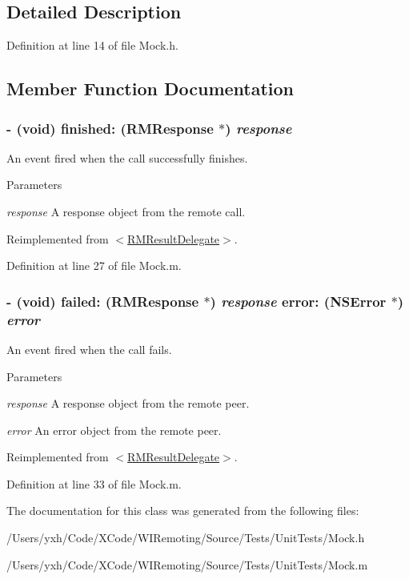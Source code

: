 \subsection{Detailed Description}


Definition at line 14 of file Mock.h.

\subsection{Member Function Documentation}
\hypertarget{interface_mock_ab15e59579bf7b5c5de900d28374062b7}{
\subsubsection[{finished:}]{\setlength{\rightskip}{0pt plus 5cm}-\/ (void) finished: ({\bf RMResponse} $\ast$) {\em response}}}
\label{interface_mock_ab15e59579bf7b5c5de900d28374062b7}


An event fired when the call successfully finishes. 
\begin{DoxyParams}{Parameters}
\item[{\em response}]A response object from the remote call. \end{DoxyParams}


Reimplemented from \hyperlink{protocol_r_m_result_delegate-p_a965fe7cc4e150bb6ecf7cbb02b9c7248}{$<$RMResultDelegate$>$}.

Definition at line 27 of file Mock.m.\hypertarget{interface_mock_ae57e780c8ddcf5c4c79af12c54d58cff}{
\subsubsection[{failed:error:}]{\setlength{\rightskip}{0pt plus 5cm}-\/ (void) failed: ({\bf RMResponse} $\ast$) {\em response}\/ error: (NSError $\ast$) {\em error}}}
\label{interface_mock_ae57e780c8ddcf5c4c79af12c54d58cff}


An event fired when the call fails. 
\begin{DoxyParams}{Parameters}
\item[{\em response}]A response object from the remote peer. \item[{\em error}]An error object from the remote peer. \end{DoxyParams}


Reimplemented from \hyperlink{protocol_r_m_result_delegate-p_a3521cd9555449b32aabdb759d2dadce5}{$<$RMResultDelegate$>$}.

Definition at line 33 of file Mock.m.

The documentation for this class was generated from the following files:\begin{DoxyCompactItemize}
\item 
/Users/yxh/Code/XCode/WIRemoting/Source/Tests/UnitTests/Mock.h\item 
/Users/yxh/Code/XCode/WIRemoting/Source/Tests/UnitTests/Mock.m\end{DoxyCompactItemize}
